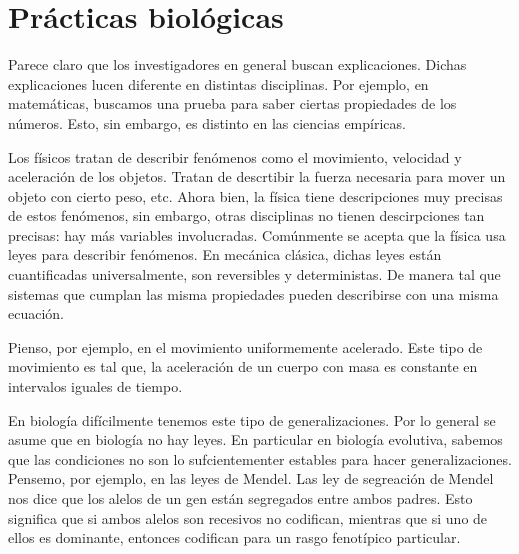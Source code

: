 \chapter{Prácticas biológicas}

Parece claro que los investigadores en general buscan explicaciones.
Dichas explicaciones lucen diferente en distintas disciplinas.
Por ejemplo, en matemáticas, buscamos una prueba para saber ciertas propiedades de los números.
Esto, sin embargo, es distinto en las ciencias empíricas.

Los físicos tratan de describir fenómenos como el movimiento, velocidad y aceleración de los objetos.
Tratan de descrtibir la fuerza necesaria para mover un objeto con cierto peso, etc.
Ahora bien, la física tiene descripciones muy precisas de estos fenómenos, sin embargo, otras disciplinas no tienen descirpciones tan precisas: hay más variables involucradas.
Comúnmente se acepta que la física usa leyes para describir fenómenos.
En mecánica clásica, dichas leyes están cuantificadas universalmente, son reversibles y deterministas.
De manera tal que sistemas que cumplan las misma propiedades pueden describirse con una misma ecuación.

Pienso, por ejemplo, en el movimiento uniformemente acelerado.
Este tipo de movimiento es tal que, la aceleración de un cuerpo con masa es constante en intervalos iguales de tiempo. 

En biología difícilmente tenemos este tipo de generalizaciones.
Por lo general se asume que en biología no hay leyes. 
En particular en biología evolutiva, sabemos que las condiciones no son lo sufcientementer estables para hacer generalizaciones.
Pensemo, por ejemplo, en las leyes de Mendel. 
Las ley de segreación de Mendel nos dice que los alelos de un gen están segregados entre ambos padres.
Esto significa que si ambos alelos son recesivos no codifican, mientras que si uno de ellos es dominante, entonces codifican para un rasgo fenotípico particular.




